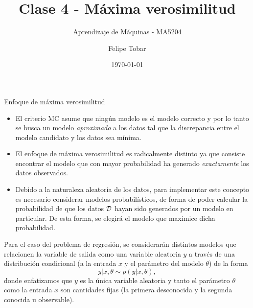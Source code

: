 \documentclass[9pt]{beamer}
\title{Clase 4 - Máxima verosimilitud}
\subtitle{Aprendizaje de Máquinas - MA5204}
\date{\today}
\author{Felipe Tobar}
\institute{Department of Mathematical Engineering \&\\ Center for Mathematical Modelling\\Universidad de Chile}
\begin{document}
\begin{frame}
  \titlepage
\end{frame}

\begin{frame}{Enfoque de máxima verosimilitud}

\begin{itemize}
	\item El criterio MC asume que ningún modelo es el modelo correcto y por lo tanto se busca un modelo \emph{aproximado} a los datos tal que la discrepancia entre el modelo candidato y los datos sea mínima.\pause
	\item El enfoque de máxima verosimilitud es radicalmente distinto ya que consiste encontrar el modelo que con mayor probabilidad ha generado \emph{exactamente} los datos observados.\pause
	\item Debido a la naturaleza aleatoria de los datos, para implementar este concepto es necesario considerar modelos probabilísticos, de forma de poder calcular la probabilidad de que los datos ${\mathcal D}$ hayan sido generados por un modelo en particular. De esta forma, se elegirá el modelo que maximice dicha probabilidad.\pause
\end{itemize}
	
Para el caso del problema de regresión, se considerarán distintos modelos que relacionen la variable de salida como una variable aleatoria $y$ a través de una distribución condicional (a la entrada $x$ y el parámetro del modelo $\theta$) de la forma 
\begin{equation*}
	y|x,\theta \sim p(y|x,\theta),\label{eq:mod_gen}
\end{equation*}
donde enfatizamos que $y$ es  la única variable aleatoria y tanto el parámetro $\theta$ como la entrada $x$ son cantidades fijas (la primera desconocida y la segunda conocida u observable).
	
\end{frame}
\end{document}
